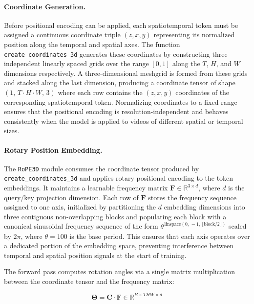 \paragraph{Coordinate Generation.}
Before positional encoding can be applied, each spatiotemporal token must be assigned a continuous coordinate triple $(z, x, y)$ representing its normalized position along the temporal and spatial axes. The function \texttt{create\_coordinates\_3d} generates these coordinates by constructing three independent linearly spaced grids over the range $[0, 1]$ along the $T$, $H$, and $W$ dimensions respectively. A three-dimensional meshgrid is formed from these grids and stacked along the last dimension, producing a coordinate tensor of shape $(1,\, T \cdot H \cdot W,\, 3)$ where each row contains the $(z, x, y)$ coordinates of the corresponding spatiotemporal token. Normalizing coordinates to a fixed range ensures that the positional encoding is resolution-independent and behaves consistently when the model is applied to videos of different spatial or temporal sizes.

\paragraph{Rotary Position Embedding.}
The \texttt{RoPE3D} module consumes the coordinate tensor produced by \texttt{create\_coordinates\_3d} and applies rotary positional encoding to the token embeddings. It maintains a learnable frequency matrix $\mathbf{F} \in \mathbb{R}^{3 \times d}$, where $d$ is the query/key projection dimension. Each row of $\mathbf{F}$ stores the frequency sequence assigned to one axis, initialized by partitioning the $d$ embedding dimensions into three contiguous non-overlapping blocks and populating each block with a canonical sinusoidal frequency sequence of the form $\theta^{\,\text{linspace}(0,\,-1,\,\lfloor \text{block}/2 \rfloor)}$ scaled by $2\pi$, where $\theta = 100$ is the base period. This ensures that each axis operates over a dedicated portion of the embedding space, preventing interference between temporal and spatial position signals at the start of training.

The forward pass computes rotation angles via a single matrix multiplication between the coordinate tensor and the frequency matrix:

\begin{equation}
    \symbf{\Theta} = \mathbf{C} \cdot \mathbf{F} \in \mathbb{R}^{B \times THW \times d}
\end{equation}

